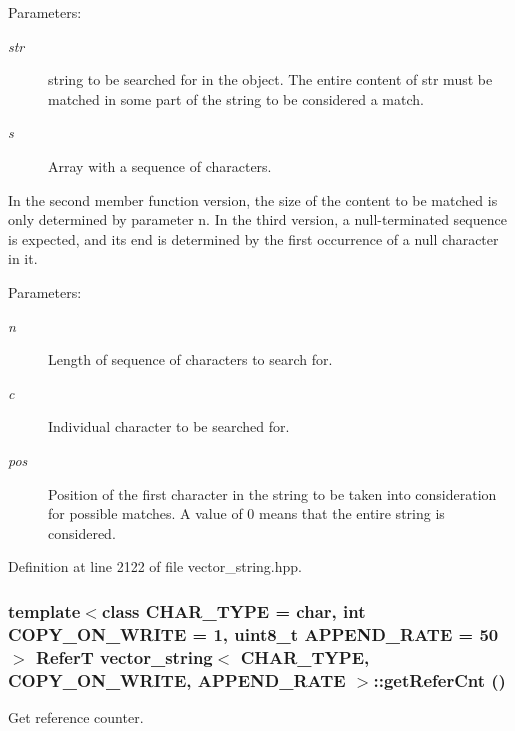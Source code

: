 \begin{Desc}
\item[Parameters:]
\begin{description}
\item[{\em str}]string to be searched for in the object. The entire content of str must be matched in some part of the string to be considered a match. \item[{\em s}]Array with a sequence of characters.\end{description}
\end{Desc}
In the second member function version, the size of the content to be matched is only determined by parameter n. In the third version, a null-terminated sequence is expected, and its end is determined by the first occurrence of a null character in it.

\begin{Desc}
\item[Parameters:]
\begin{description}
\item[{\em n}]Length of sequence of characters to search for. \item[{\em c}]Individual character to be searched for. \item[{\em pos}]Position of the first character in the string to be taken into consideration for possible matches. A value of 0 means that the entire string is considered. \end{description}
\end{Desc}


Definition at line 2122 of file vector\_\-string.hpp.\hypertarget{classvector__string_80e8d35e9a5ab1fc2443035e218374e8}{
\subsubsection[{getReferCnt}]{\setlength{\rightskip}{0pt plus 5cm}template$<$class CHAR\_\-TYPE  = char, int COPY\_\-ON\_\-WRITE = 1, uint8\_\-t APPEND\_\-RATE = 50$>$ ReferT {\bf vector\_\-string}$<$ CHAR\_\-TYPE, COPY\_\-ON\_\-WRITE, APPEND\_\-RATE $>$::getReferCnt ()}}
\label{classvector__string_80e8d35e9a5ab1fc2443035e218374e8}


Get reference counter. 

